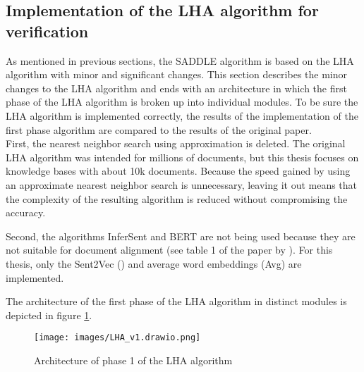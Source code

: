     
\subsection{Implementation of the LHA algorithm for verification}
As mentioned in previous sections, the SADDLE algorithm is based on the LHA algorithm with minor and significant changes. This section describes the minor changes to the LHA algorithm and ends with an architecture in which the first phase of the LHA algorithm is broken up into individual modules. To be sure the LHA algorithm is implemented correctly, the results of the implementation of the first phase algorithm are compared to the results of the original paper. \\

First, the nearest neighbor search using approximation is deleted. The original LHA algorithm was intended for millions of documents, but this thesis focuses on knowledge bases with about 10k documents. Because the speed gained by using an approximate nearest neighbor search is unnecessary, leaving it out means that the complexity of the resulting algorithm is reduced without compromising the accuracy.

Second, the algorithms InferSent \citep{Infersent} and BERT are not being used because they are not suitable for document alignment (see table 1 of the paper by \citet{nikolov2018large}). For this thesis, only the Sent2Vec (\citep{pagliardini2017unsupervised}) and average word embeddings (Avg) are implemented.


The architecture of the first phase of the LHA algorithm in distinct modules is depicted in figure \ref{imgLHA_v1}. 

\begin{figure}[h]
\centering
\captionsetup{justification=centering}

\texttt{[image: images/LHA\_v1.drawio.png]}
\caption{Architecture of phase 1 of the LHA algorithm}
\label{imgLHA_v1}
\end{figure}

